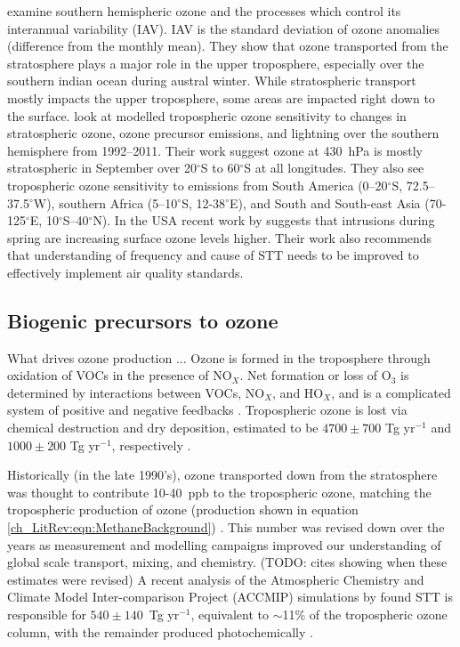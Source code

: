     \cite{Liu2017} examine southern hemispheric ozone and the processes which control its interannual variability (IAV).
    IAV is the standard deviation of ozone anomalies (difference from the monthly mean).
    They show that ozone transported from the stratosphere plays a major role in the upper troposphere, especially over the southern indian ocean during austral winter.
    While stratospheric transport mostly impacts the upper troposphere, some areas are impacted right down to the surface.
    \citet{Liu2017} look at modelled tropospheric ozone sensitivity to changes in stratospheric ozone, ozone precursor emissions, and lightning over the southern hemisphere from 1992--2011. 
    Their work suggest ozone at 430~hPa is mostly stratospheric in September over 20$^{\circ}$S to 60$^{\circ}$S at all longitudes.
    They also see tropospheric ozone sensitivity to emissions from South America (0--20$^{\circ}$S, 72.5--37.5$^{\circ}$W), southern Africa (5--10$^{\circ}$S, 12-38$^{\circ}$E), and South and South-east Asia (70-125$^{\circ}$E, 10$^{\circ}$S--40$^{\circ}$N).
    In the USA recent work by \cite{Lin2015} suggests that intrusions during spring are increasing surface ozone levels higher.
    Their work also recommends that understanding of frequency and cause of STT needs to be improved to effectively implement air quality standards.
    
  \subsection{Biogenic precursors to ozone}
    \label{LR:sec:BiogenicOzonePrecursors}
    What drives ozone production
    ...
    Ozone is formed in the troposphere through oxidation of VOCs in the presence of NO$_X$.
    Net formation or loss of O$_3$ is determined by interactions between VOCs, NO$_X$, and HO$_X$, and is a complicated system of positive and negative feedbacks \citep{Atkinson2000}.
    Tropospheric ozone is lost via chemical destruction and dry deposition, estimated to be $4700\pm700$ Tg yr$^{-1}$ and $1000\pm200$ Tg yr$^{-1}$, respectively \citep{Stevenson2006}. 
    
    Historically (in the late 1990's), ozone transported down from the stratosphere was thought to contribute 10-40~ppb to the tropospheric ozone,  matching the tropospheric production of ozone (production shown in equation \ref{ch_LitRev:eqn:MethaneBackground}) \citep{Atkinson2000,Stohl2003}.
    This number was revised down over the years as measurement and modelling campaigns improved our understanding of global scale transport, mixing, and chemistry. (TODO: cites showing when these estimates were revised)
    A recent analysis of the Atmospheric Chemistry and Climate Model Inter-comparison Project (ACCMIP) simulations by \citet{Young2013} found STT is responsible for $540\pm140$~Tg yr$^{-1}$, equivalent to $\sim$11\% of the tropospheric ozone column, with the remainder produced photochemically \citep{Monks2015}.

